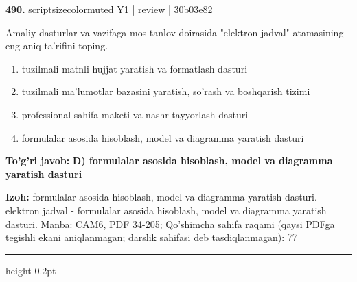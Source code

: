 \documentclass[10pt,a4paper]{article}
\begin{document}
{\bfseries\sffamily\color{ink} 490.} {scriptsizecolor{muted} Y1 | review | 30b03e82}
\par
Amaliy dasturlar va vazifaga mos tanlov doirasida "elektron jadval" atamasining eng aniq ta'rifini toping.
\begin{enumerate}[label=\Alph*),leftmargin=9mm]
\item tuzilmali matnli hujjat yaratish va formatlash dasturi
\item tuzilmali ma'lumotlar bazasini yaratish, so'rash va boshqarish tizimi
\item professional sahifa maketi va nashr tayyorlash dasturi
\item formulalar asosida hisoblash, model va diagramma yaratish dasturi
\end{enumerate}
\begin{tcolorbox}[enhanced,breakable,colback=teal!4,colframe=teal!60!black,boxrule=0.45pt,arc=1.2mm,left=2.7mm,right=2.7mm,top=1.8mm,bottom=1.8mm,before skip=2mm,after skip=2mm]
{\bfseries\sffamily\color{teal}To'g'ri javob:} \textbf{D) formulalar asosida hisoblash, model va diagramma yaratish dasturi}
\par\smallskip
{\bfseries Izoh:} formulalar asosida hisoblash, model va diagramma yaratish dasturi. elektron jadval - formulalar asosida hisoblash, model va diagramma yaratish dasturi. Manba: CAM6, PDF 34-205; Qo'shimcha sahifa raqami (qaysi PDFga tegishli ekani aniqlanmagan; darslik sahifasi deb tasdiqlanmagan): 77
\end{tcolorbox}
\vspace{2mm}\hrule height 0.2pt\vspace{3mm}
\end{document}
